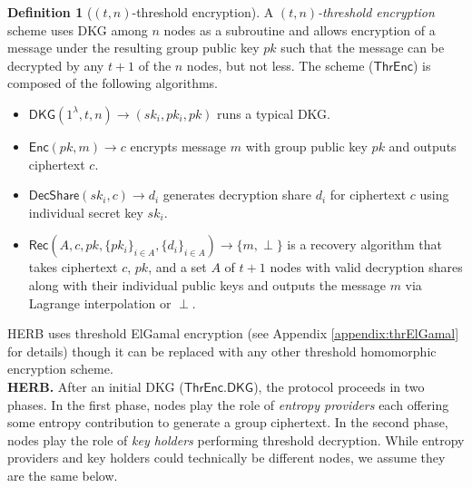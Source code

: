 \documentclass[letterpaper,twocolumn,10pt]{article}
\theoremstyle{definition}
\newtheorem{definition}[theorem]{Definition}
\theoremstyle{remark}
\begin{document}
\begin{definition}[$(t, n)$-threshold encryption]
A \textit{$(t, n)$-threshold encryption} scheme uses DKG among $n$ nodes as a subroutine and allows encryption of a message under the resulting group public key $pk$ such that the message can be decrypted by any $t + 1$ of the $n$ nodes, but not less. The scheme ($\mathsf{ThrEnc}$) is composed of the following algorithms.
\begin{itemize}
    \item $\mathsf{DKG}(1^\lambda, t, n) \rightarrow (sk_i, pk_i, pk)$ runs a typical DKG.
    \item $\mathsf{Enc}(pk, m) \rightarrow c$ encrypts message $m$ with group public key $pk$ and outputs ciphertext $c$.
    \item $\mathsf{DecShare}(sk_i, c) \rightarrow d_i$ generates decryption share $d_i$ for ciphertext $c$ using individual secret key $sk_i$.
    \item $\mathsf{Rec}(A, c, pk, \{pk_i\}_{i \in A}, \{d_i\}_{i \in A}) \rightarrow \{m, \perp\}$ is a recovery algorithm that takes ciphertext $c$, $pk$, and a set $A$ of $t + 1$ nodes with valid decryption shares along with their individual public keys and outputs the message $m$ via Lagrange interpolation or $\perp$.
\end{itemize}
\end{definition}

HERB uses threshold ElGamal encryption \cite{desmedt1990Threshold, fouque2001threshold} (see Appendix \ref{appendix:thrElGamal} for details) though it can be replaced with any other threshold homomorphic encryption scheme.\\

\noindent\textbf{HERB.} After an initial DKG ($\mathsf{ThrEnc.DKG}$), the protocol proceeds in two phases. In the first phase, nodes play the role of \textit{entropy providers} each offering some entropy contribution to generate a group ciphertext. In the second phase, nodes play the role of \textit{key holders} performing threshold decryption. While entropy providers and key holders could technically be different nodes, we assume they are the same below.
\end{document}
